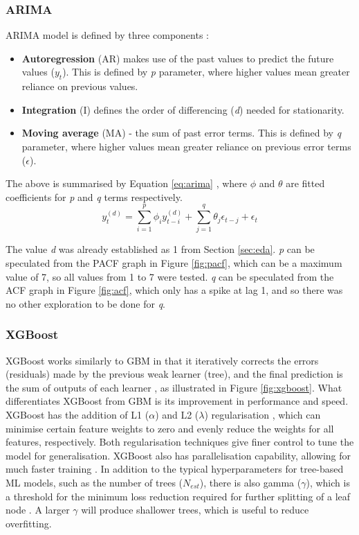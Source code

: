 \documentclass[ %
                    author={Raj Dhakan},
                supervisor={Dr. Ayush Joshi},
                    degree={MSc},
                     title={Ethereum Price Prediction using Internal and External Factors},
                  subtitle={},
                      type={},
                      year={2025}]{dissertation}
\begin{document}
\subsubsection{ARIMA}
ARIMA model is defined by three components \cite{sailaja2024crypto}: 
\begin{itemize}
    \item \textbf{Autoregression} (AR) makes use of the past values to predict the future values ($y_t$). This is defined by \textit{p} parameter, where higher values mean greater reliance on previous values.
    \item \textbf{Integration} (I) defines the order of differencing (\textit{d}) needed for stationarity.
    \item \textbf{Moving average} (MA) - the sum of past error terms. This is defined by \textit{q} parameter, where higher values mean greater reliance on previous error terms ($\epsilon$).
\end{itemize}
The above is summarised by Equation \ref{eq:arima} \cite{pyflux_arima}, where $\phi$ and $\theta$ are fitted coefficients for \textit{p} and \textit{q} terms respectively.
\begin{equation}
\label{eq:arima}
y_t^{(d)} = \sum_{i=1}^{p} \phi_i y_{t-i}^{(d)} + \sum_{j=1}^{q} \theta_j \epsilon_{t-j}+ \epsilon_t 
\end{equation}

The value \textit{d} was already established as 1 from Section \ref{sec:eda}. \textit{p} can be speculated from the PACF graph in Figure \ref{fig:pacf}, which can be a maximum value of 7, so all values from 1 to 7 were tested. \textit{q} can be speculated from the ACF graph in Figure \ref{fig:acf}, which only has a spike at lag 1, and so there was no other exploration to be done for \textit{q}.

\subsubsection{XGBoost}
XGBoost works similarly to GBM in that it iteratively corrects the errors (residuals) made by the previous weak learner (tree), and the final prediction is the sum of outputs of each learner \cite{chen2016xgboost}, as illustrated in Figure \ref{fig:xgboost}. What differentiates XGBoost from GBM is its improvement in performance and speed. XGBoost has the addition of L1 ($\alpha$) and L2 ($\lambda$) regularisation \cite{xgboost_parameters}, which can minimise certain feature weights to zero and evenly reduce the weights for all features, respectively. Both regularisation techniques give finer control to tune the model for generalisation. XGBoost also has parallelisation capability, allowing for much faster training \cite{chen2016xgboost}. In addition to the typical hyperparameters for tree-based ML models, such as the number of trees ($N_{est}$), there is also gamma ($\gamma$), which is a threshold for the minimum loss reduction required for further splitting of a leaf node \cite{xgboost_parameters}. A larger $\gamma$ will produce shallower trees, which is useful to reduce overfitting. 
\end{document}
